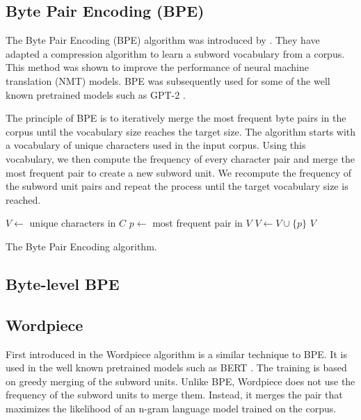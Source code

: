 \subsection{Byte Pair Encoding (BPE)}

The Byte Pair Encoding (BPE) algorithm was introduced by \citet{Sennrich2015}. They have adapted a compression algorithm  to learn a subword vocabulary from a corpus. This method was shown to improve the performance of neural machine translation (NMT) models. BPE was subsequently used for some of the well known pretrained models such as GPT-2 \citep{Radford2019}.

The principle of BPE is to iteratively merge the most frequent byte pairs in the corpus until the vocabulary size reaches the target size. The algorithm starts with a vocabulary of unique characters used in the input corpus. Using this vocabulary, we then compute the frequency of every character pair and merge the most frequent pair to create a new subword unit. We recompute the frequency of the subword unit pairs and repeat the process until the target vocabulary size is reached.

\begin{algorithm}
    \begin{algorithmic}
        \State $V \gets$ unique characters in $C$
        \State $p \gets$ most frequent pair in $V$
        \State $V \gets V \cup \{p\}$
        \EndWhile
        \State \Return $V$
        \EndFunction
    \end{algorithmic}
    \caption{The Byte Pair Encoding algorithm.}
    \label{alg:bpe}
\end{algorithm}

\subsection{Byte-level BPE}


\subsection{Wordpiece}

First introduced in \cite{SchusterandNakajima2012)} the Wordpiece algorithm is a similar technique to BPE. It is used in the well known pretrained models such as BERT \citep{devlin_bert_2019}. The training is based on greedy merging of the subword units. Unlike BPE, Wordpiece does not use the frequency of the subword units to merge them. Instead, it merges the pair that maximizes the likelihood of an n-gram language model trained on the corpus.

